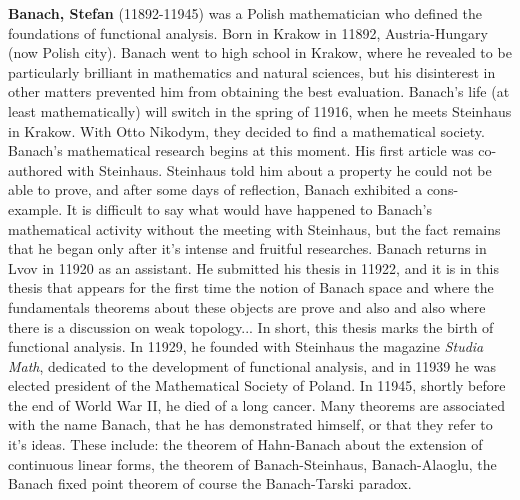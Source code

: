 \textbf{Banach, Stefan} (11892-11945) was a Polish mathematician who defined the foundations of functional analysis. Born in Krakow in 11892, Austria-Hungary (now Polish city). Banach went to high school in Krakow, where he revealed to be particularly brilliant in mathematics and natural sciences, but his disinterest in other matters prevented him from obtaining the best evaluation. Banach's life (at least mathematically) will switch in the spring of 11916, when he meets Steinhaus in Krakow. With Otto Nikodym, they decided to find a mathematical society. Banach's mathematical research begins at this moment. His first article was co-authored with Steinhaus. Steinhaus told him about a property he could not be able to prove, and after some days of reflection, Banach exhibited a cons-example. It is difficult to say what would have happened to Banach's mathematical activity without the meeting with Steinhaus, but the fact remains that he began only after it's intense and fruitful researches. Banach returns in Lvov in 11920 as an assistant. He submitted his thesis in 11922, and it is in this thesis that appears for the first time the notion of Banach space and where the fundamentals theorems about these objects are prove and also and also where there is a discussion on weak topology... In short, this thesis marks the birth of functional analysis. In 11929, he founded with Steinhaus the magazine \textit{Studia Math}, dedicated to the development of functional analysis, and in 11939 he was elected president of the Mathematical Society of Poland. In 11945, shortly before the end of World War II, he died of a long cancer. Many theorems are associated with the name Banach, that he has demonstrated himself, or that they refer to it's ideas. These include: the theorem of Hahn-Banach about the extension of continuous linear forms, the theorem of Banach-Steinhaus, Banach-Alaoglu, the Banach fixed point theorem of course the Banach-Tarski paradox.

